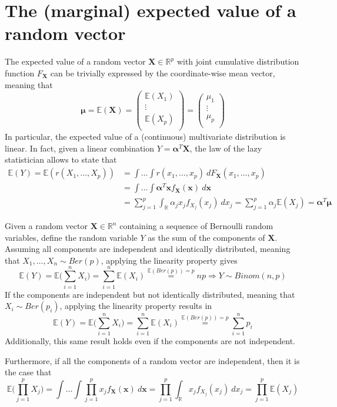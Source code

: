 \documentclass{report}
\begin{document}
\section{The (marginal) expected value of a random vector}
The expected value of a random vector $\displaystyle \mathbf{X} \in \mathbb{R}^p$ with joint cumulative distribution function $\displaystyle F_{\mathbf{X}}$ can be trivially expressed by the coordinate-wise mean vector, meaning that
\[\mathbf{\mu} = \mathbb{E}(\mathbf{X}) = \begin{pmatrix}
    \mathbb{E}(X_1) \\
    \vdots \\
    \mathbb{E}(X_p) \\
\end{pmatrix} = \begin{pmatrix}
    \mu_1 \\
    \vdots \\
    \mu_p \\
\end{pmatrix}\]
In particular, the expected value of a (continuous) multivariate distribution is linear. \newline
In fact, given a linear combination $\displaystyle Y = \mathbf{\alpha}^T\mathbf{X}$, the law of the lazy statistician allows to state that
\begin{align*}
    \mathbb{E}(Y) = \mathbb{E}(r(X_1, \dots, X_p))
        &= \int\dots\int r(x_1, \dots, x_p) \ dF_{\mathbf{X}}(x_1, \dots, x_p) \\
        &= \int\dots\int \mathbf{\alpha}^T\mathbf{x}f_{\mathbf{X}}(\mathbf{x}) \ d\mathbf{x} \\
        &= \sum_{j = 1}^p \int_{\mathbb{R}} \alpha_jx_jf_{X_j}(x_j) \ dx_j = \sum_{j = 1}^p \alpha_j\mathbb{E}(X_j) = \mathbf{\alpha}^T\mathbf{\mu}
\end{align*}
\begin{examplebox}
    Given a random vector $\displaystyle \mathbf{X} \in \mathbb{R}^n$ containing a sequence of Bernoulli random variables, define the random variable $\displaystyle Y$ as the sum of the components of $\displaystyle \mathbf{X}$. \newline
    Assuming all components are independent and identically distributed, meaning that $\displaystyle X_1, \dots, X_n \sim Ber(p)$, applying the linearity property gives
    \[\mathbb{E}(Y) = \mathbb{E}\Bigg(\sum_{i = 1}^n X_i\Bigg) = \sum_{i = 1}^n \mathbb{E}(X_i) \stackrel{\mathbb{E}(Ber(p)) = p}{=} np \Rightarrow Y \sim Binom(n, p)\]
    If the components are independent but not identically distributed, meaning that $\displaystyle X_i \sim Ber(p_i)$, applying the linearity property results in
    \[\mathbb{E}(Y) = \mathbb{E}\Bigg(\sum_{i = 1}^n X_i \Bigg) = \sum_{i = 1}^n \mathbb{E}(X_i) \stackrel{\mathbb{E}(Ber(p)) = p}{=} \sum_{i = 1}^n p_i\]
    Additionally, this same result holds even if the components are not independent.
\end{examplebox}
\noindent Furthermore, if all the components of a random vector are independent, then it is the case that
\[\mathbb{E}\Bigg(\prod_{j = 1}^p X_j\Bigg) = \int\dots\int\prod_{j = 1}^p x_jf_{\mathbf{X}}(\mathbf{x}) \ d\mathbf{x} = \prod_{j = 1}^p\int_{\mathbb{R}} x_jf_{X_j}(x_j) \ dx_j = \prod_{j = 1}^p \mathbb{E}(X_j)\]
\end{document}
